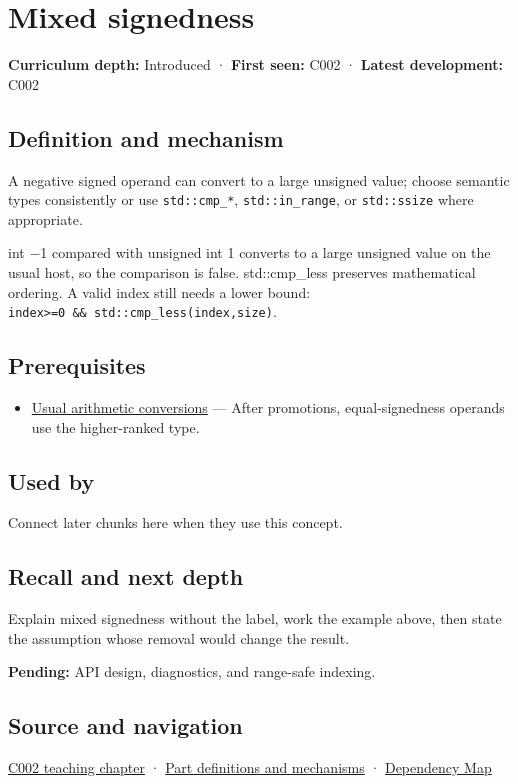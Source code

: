 \hypertarget{appendix-736a2345de4a}{}\label{referencestart:appendix-736a2345de4a}
\section{Mixed signedness}\label{appendix-736a2345de4a-mixed-signedness}

\textbf{Curriculum depth:} Introduced · \textbf{First seen:} C002 · \textbf{Latest development:} C002

\subsection{Definition and mechanism}\label{appendix-736a2345de4a-definition-and-mechanism}

A negative signed operand can convert to a large unsigned value; choose semantic types consistently or use \texttt{std::cmp\_*}, \texttt{std::in\_range}, or \texttt{std::ssize} where appropriate.

int −1 compared with unsigned int 1 converts to a large unsigned value on the usual host, so the comparison is false. std::cmp\_less preserves mathematical ordering. A valid index still needs a lower bound: \texttt{index\textgreater{}=0\ \&\&\ std::cmp\_less(index,size)}.

\subsection{Prerequisites}\label{appendix-736a2345de4a-prerequisites}

\begin{itemize}
\tightlist
\item
  \hyperref[appendix-5e2d663adf7f]{Usual arithmetic conversions} --- After promotions, equal-signedness operands use the higher-ranked type.
\end{itemize}

\subsection{Used by}\label{appendix-736a2345de4a-used-by}

Connect later chunks here when they use this concept.

\subsection{Recall and next depth}\label{appendix-736a2345de4a-recall-and-next-depth}

Explain mixed signedness without the label, work the example above, then state the assumption whose removal would change the result.

\textbf{Pending:} API design, diagnostics, and range-safe indexing.

\subsection{Source and navigation}\label{appendix-736a2345de4a-source-and-navigation}

\hyperref[01-foundations-i-ch001-arithmetic-becomes-a-policy]{C002 teaching chapter} · \hyperref[appendix-fd090d982a15]{Part definitions and mechanisms} · \hyperref[appendix-4ad47bdd269a]{Dependency Map}
